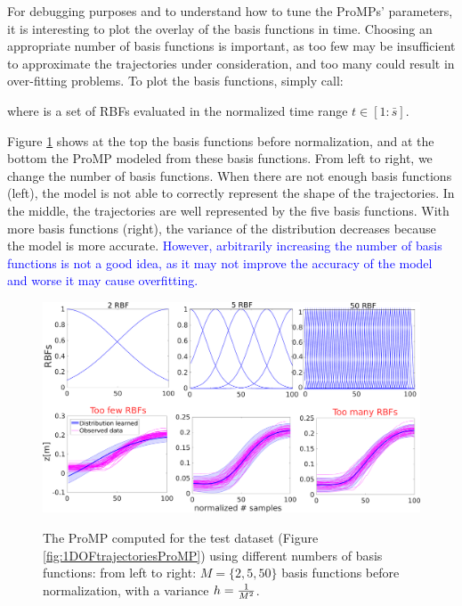 \documentclass[utf8]{frontiersSCNS} %
\newcommand{\rev}[1]{\textcolor{blue}{#1}}
\newcommand{\todo}[1]{\textcolor{red}{\textbf{/*#1*/}}}
\begin{document}
For debugging purposes and to understand how to tune the ProMPs' parameters, it is interesting to plot the overlay of the basis functions in time. Choosing an appropriate number of basis functions is important, as too few may be insufficient to approximate the trajectories under consideration, and too many could result in over-fitting problems.
To plot the basis functions, simply call: 


where  is a set of RBFs evaluated in the normalized time range $t \in [1:\bar{s}]$.

Figure \ref{fig:1DOFtrajectoriesProMPbasis} shows at the top the basis functions before normalization, and at the bottom the ProMP modeled from these basis functions. From left to right, we change the number of basis functions. When there are not enough basis functions (left), the model is not able to correctly represent the shape of the trajectories. In the middle, the trajectories are well represented by the five basis functions. With more basis functions (right), the variance of the distribution decreases because the model is more accurate. 
\rev{However, arbitrarily increasing the number of basis functions is not a good idea, as it may not improve the accuracy of the model and worse it may cause overfitting. }

\begin{figure}[h]
\centering
{
\includegraphics[width=\hsize]{img/1DOFtrajectoriesProMPbasisV4.pdf}
}
\caption{The ProMP computed for the test dataset (Figure \ref{fig:1DOFtrajectoriesProMP}) using different numbers of basis functions: from left to right: $M=\{2,5,50\}$ basis functions before normalization, with a variance $h={1 \over M^2}$. }
\label{fig:1DOFtrajectoriesProMPbasis}
\end{figure}
\end{document}
